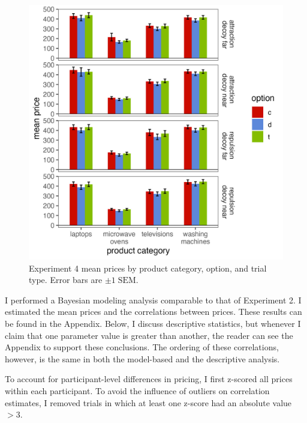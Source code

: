 \begin{figure}
    \includegraphics[width=200mm,scale=0.5]{figures/price_m_by_effect_category.jpeg}
    \caption{Experiment 4 mean prices by product category, option, and trial type. Error bars are $\pm 1\;\text{SEM}$.}
    \label{fig:price_m_by_effect_category}
\end{figure}

I performed a Bayesian modeling analysis comparable to that of Experiment 2. I estimated the mean prices and the correlations between prices. These results can be found in the Appendix. Below, I discuss descriptive statistics, but whenever I claim that one parameter value is greater than another, the reader can see the Appendix to support these conclusions. The ordering of these correlations, however, is the same in both the model-based and the descriptive analysis.

To account for participant-level differences in pricing, I first z-scored all prices within each participant. To avoid the influence of outliers on correlation estimates, I removed trials in which at least one z-score had an absolute value $>3$. 

